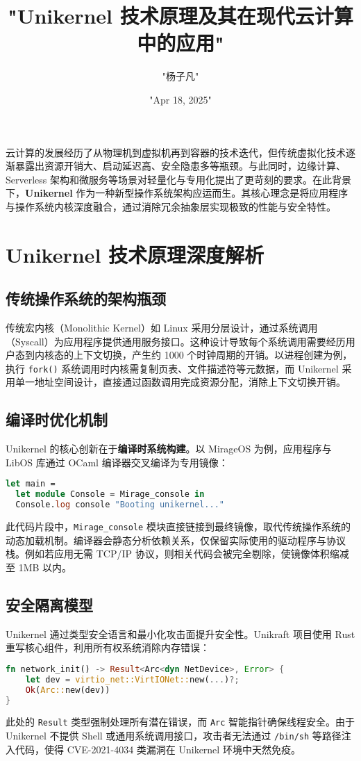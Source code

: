 \title{"Unikernel 技术原理及其在现代云计算中的应用"}
\author{"杨子凡"}
\date{"Apr 18, 2025"}
\maketitle
云计算的发展经历了从物理机到虚拟机再到容器的技术迭代，但传统虚拟化技术逐渐暴露出资源开销大、启动延迟高、安全隐患多等瓶颈。与此同时，边缘计算、Serverless 架构和微服务等场景对轻量化与专用化提出了更苛刻的要求。在此背景下，\textbf{Unikernel} 作为一种新型操作系统架构应运而生。其核心理念是将应用程序与操作系统内核深度融合，通过消除冗余抽象层实现极致的性能与安全特性。\par
\chapter{Unikernel 技术原理深度解析}
\section{传统操作系统的架构瓶颈}
传统宏内核（Monolithic Kernel）如 Linux 采用分层设计，通过系统调用（Syscall）为应用程序提供通用服务接口。这种设计导致每个系统调用需要经历用户态到内核态的上下文切换，产生约 1000 个时钟周期的开销。以进程创建为例，执行 \texttt{fork()} 系统调用时内核需复制页表、文件描述符等元数据，而 Unikernel 采用单一地址空间设计，直接通过函数调用完成资源分配，消除上下文切换开销。\par
\section{编译时优化机制}
Unikernel 的核心创新在于\textbf{编译时系统构建}。以 MirageOS 为例，应用程序与 LibOS 库通过 OCaml 编译器交叉编译为专用镜像：\par
\begin{lstlisting}[language=ocaml]
let main = 
  let module Console = Mirage_console in
  Console.log console "Booting unikernel..." 
\end{lstlisting}
此代码片段中，\texttt{Mirage\_{}console} 模块直接链接到最终镜像，取代传统操作系统的动态加载机制。编译器会静态分析依赖关系，仅保留实际使用的驱动程序与协议栈。例如若应用无需 TCP/IP 协议，则相关代码会被完全剔除，使镜像体积缩减至 1MB 以内。\par
\section{安全隔离模型}
Unikernel 通过类型安全语言和最小化攻击面提升安全性。Unikraft 项目使用 Rust 重写核心组件，利用所有权系统消除内存错误：\par
\begin{lstlisting}[language=rust]
fn network_init() -> Result<Arc<dyn NetDevice>, Error> {
    let dev = virtio_net::VirtIONet::new(...)?;
    Ok(Arc::new(dev))
}
\end{lstlisting}
此处的 \texttt{Result} 类型强制处理所有潜在错误，而 \texttt{Arc} 智能指针确保线程安全。由于 Unikernel 不提供 Shell 或通用系统调用接口，攻击者无法通过 \texttt{/bin/sh} 等路径注入代码，使得 CVE-2021-4034 类漏洞在 Unikernel 环境中天然免疫。\par
